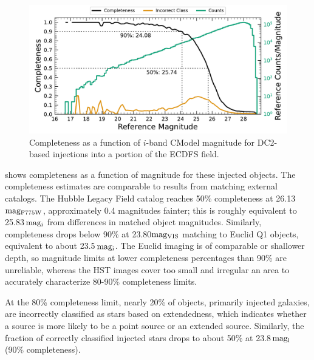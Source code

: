 \begin{figure}[htb]
\centering
\includegraphics[width=0.98\linewidth]{figures/injected_lsst_cells_v1_5063_i_completeness_any.pdf}
\caption{Completeness as a function of $i$-band CModel magnitude for \gls{DC2}-based injections into a portion of the \gls{ECDFS} field.}
\label{fig:injected_lsst_cells_v1_5063_i_completeness_any}
\vspace{0.1cm}
\end{figure}

 shows completeness as a function of magnitude for these injected objects. The completeness estimates are comparable to results from matching external catalogs. The Hubble Legacy Field catalog \citep{2019ApJS..244...16W,2016arXiv160600841I} reaches 50\% completeness at 26.13\,${\rm mag_{F775W}}$, approximately 0.4 magnitudes fainter; this is roughly equivalent to 25.83\,${\rm mag_{i}}$ from differences in matched object magnitudes. Similarly, completeness drops below 90\% at 23.80${\rm mag_{VIS}}$ matching to Euclid Q1 \citep{2025arXiv250315305E} objects, equivalent to about 23.5\,${\rm mag_{i}}$. 
The Euclid imaging is of comparable or shallower depth, so magnitude limits at lower completeness percentages than 90\% are unreliable, whereas the HST images cover too small and irregular an area to accurately characterize 80-90\% completeness limits.

At the 80\% completeness limit, nearly 20\% of objects, primarily injected galaxies, are incorrectly classified as stars based on extendedness, which indicates whether a source is more likely to be a point source or an extended source.
Similarly, the fraction of correctly classified injected stars drops to about 50\% at 23.8\,${\rm mag_{i}}$ (90\% completeness).

